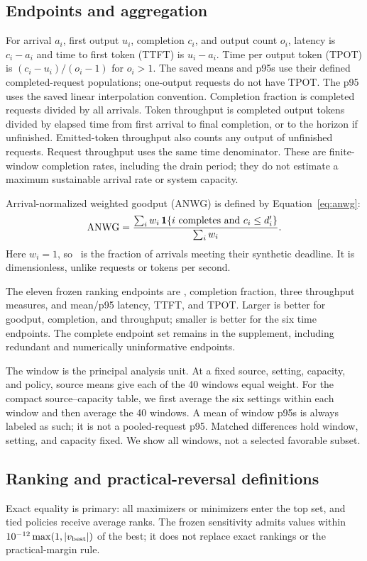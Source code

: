 \subsection{Endpoints and aggregation}
For arrival $a_i$, first output $u_i$, completion $c_i$, and output count
$o_i$, latency is $c_i-a_i$ and time to first token (TTFT) is $u_i-a_i$.
Time per output token (TPOT) is $(c_i-u_i)/(o_i-1)$ for $o_i>1$.
The saved means and p95s use their defined completed-request populations;
one-output requests do not have TPOT. The p95 uses the saved linear
interpolation convention. Completion fraction is completed requests divided
by all arrivals. Token throughput is completed output tokens divided by
elapsed time from first arrival to final completion, or to the horizon if
unfinished. Emitted-token throughput also counts any output of unfinished
requests. Request throughput uses the same time denominator.
These are finite-window completion rates, including the drain period;
they do not estimate a maximum sustainable arrival rate or system capacity.

Arrival-normalized weighted goodput (ANWG) is defined by
Equation~\ref{eq:anwg}:
\begin{equation}\label{eq:anwg}
 \mathrm{ANWG}=\frac{\sum_i w_i\,\mathbf{1}\{i\text{ completes and }c_i\leq d_i'\}}
 {\sum_i w_i}.
\end{equation}
Here $w_i=1$, so \anwg\ is the fraction of arrivals meeting their synthetic
deadline. It is dimensionless, unlike requests or tokens per second.

The eleven frozen ranking endpoints are \anwg, completion fraction, three
throughput measures, and mean/p95 latency, TTFT, and TPOT. Larger is better
for goodput, completion, and throughput; smaller is better for the six
time endpoints. The complete endpoint set remains in the supplement,
including redundant and numerically uninformative endpoints.

The window is the principal analysis unit. At a fixed source, setting,
capacity, and policy, source means give each of the 40 windows equal weight.
For the compact source--capacity table, we first average the six settings
within each window and then average the 40 windows. A mean of window p95s
is always labeled as such; it is not a pooled-request p95. Matched differences
hold window, setting, and capacity fixed. We show all windows, not a selected
favorable subset.

\subsection{Ranking and practical-reversal definitions}\label{sec:reversal-rule}
Exact equality is primary: all maximizers or minimizers enter the top set,
and tied policies receive average ranks. The frozen sensitivity admits
values within $10^{-12}\max(1,|v_{\rm best}|)$ of the best; it does not
replace exact rankings or the practical-margin rule.

